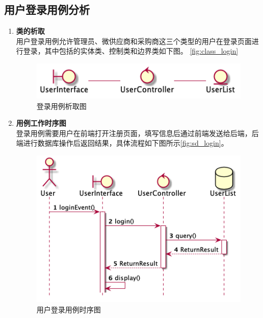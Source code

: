 	\subsection{用户登录用例分析} %
	\label{sub:用户登录用例分析_name}
	\begin{enumerate}
		\item \textbf{类的析取} \\
		用户登录用例允许管理员、微供应商和采购商这三个类型的用户在登录页面进行登录，其中包括的实体类、控制类和边界类如下图。
		\autoref{fig:class_login}
		\begin{figure}[htp]
		    \centering
		    \includegraphics[width=12cm]{misc/figure_src/class_diagram/login.png}
		    \caption{登录用例析取图}
		    \label{fig:class_login}
		\end{figure}
		\item \textbf{用例工作时序图} \\
		登录用例需要用户在前端打开注册页面，填写信息后通过前端发送给后端，后端进行数据库操作后返回结果，具体流程如下图所示\autoref{fig:sd_login}。

		\begin{figure}[htp]
		    \centering
		    \includegraphics[width=12cm]{misc/figure_src/sequence_diagram/sd_login.png}
		    \caption{用户登录用例时序图}
		    \label{fig:sd_login}
		\end{figure}
	\end{enumerate}
	
